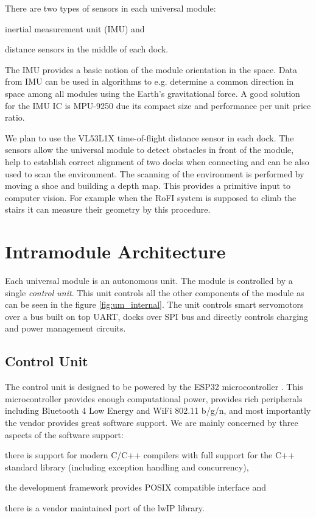 There are two types of sensors in each universal module:
\begin{enumerate*}
    \item inertial measurement unit (IMU) and
    \item distance sensors in the middle of each dock.
\end{enumerate*}
The IMU provides a basic notion of the module orientation in the space. Data
from IMU can be used in algorithms to e.g. determine a common direction in space
among all modules using the Earth's gravitational force. A good solution for the
IMU IC is MPU-9250 due its compact size and performance per unit
price ratio.

We plan to use the VL53L1X time-of-flight distance sensor in each
dock. The sensors allow the universal module to detect obstacles in front of the
module, help to establish correct alignment of two docks when connecting and can
be also used to scan the environment. The scanning of the environment is
performed by moving a shoe and building a depth map. This provides a primitive
input to computer vision. For example when the RoFI system is supposed to climb
the stairs it can measure their geometry by this procedure.

\section{Intramodule Architecture}

Each universal module is an autonomous unit. The module is controlled by a
single \emph{control unit}. This unit controls all the other components of the
module as can be seen in the figure \ref{fig:um_internal}. The unit controls
smart servomotors over a bus built on top UART, docks over SPI bus and directly
controls charging and power management circuits.

\subsection{Control Unit}

The control unit is designed to be powered by the ESP32 microcontroller
. This microcontroller provides enough computational power, provides
rich peripherals including Bluetooth 4 Low Energy and WiFi 802.11 b/g/n, and
most importantly the vendor provides great software support. We are mainly
concerned by three aspects of the software support:
\begin{enumerate*}
    \item there is support for modern C/C++ compilers with full support for the
    C++ standard library (including exception handling and concurrency),
    \item the development framework provides POSIX compatible interface and
    \item there is a vendor maintained port of the lwIP library.
\end{enumerate*}

